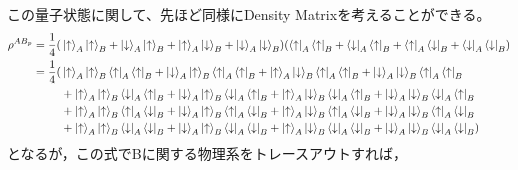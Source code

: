 この量子状態に関して、先ほど同様にDensity Matrixを考えることができる。
\begin{align}
  \rho^{AB_{p}}=\frac{1}{4}(&\ket{\uparrow}_{A}\ket{\uparrow}_{B}+\ket{\downarrow}_{A}\ket{\uparrow}_{B}+\ket{\uparrow}_{A}\ket{\downarrow}_{B}+\ket{\downarrow}_{A}\ket{\downarrow}_{B})
  (\bra{\uparrow}_{A}\bra{\uparrow}_{B}+\bra{\downarrow}_{A}\bra{\uparrow}_{B}+\bra{\uparrow}_{A}\bra{\downarrow}_{B}+\bra{\downarrow}_{A}\bra{\downarrow}_{B}) \nonumber \\
  =\frac{1}{4}(
&\ket{\uparrow}_{A}\ket{\uparrow}_{B}\bra{\uparrow}_{A}\bra{\uparrow}_{B}+\ket{\downarrow}_{A}\ket{\uparrow}_{B}\bra{\uparrow}_{A}\bra{\uparrow}_{B}+\ket{\uparrow}_{A}\ket{\downarrow}_{B}
\bra{\uparrow}_{A}\bra{\uparrow}_{B}+\ket{\downarrow}_{A}\ket{\downarrow}_{B}\bra{\uparrow}_{A}\bra{\uparrow}_{B}\nonumber \\
&+\ket{\uparrow}_{A}\ket{\uparrow}_{B}\bra{\downarrow}_{A}\bra{\uparrow}_{B}+\ket{\downarrow}_{A}\ket{\uparrow}_{B}\bra{\downarrow}_{A}\bra{\uparrow}_{B}+\ket{\uparrow}_{A}\ket{\downarrow}_{B}
\bra{\downarrow}_{A}\bra{\uparrow}_{B}+\ket{\downarrow}_{A}\ket{\downarrow}_{B}\bra{\downarrow}_{A}\bra{\uparrow}_{B}\nonumber \\
&+\ket{\uparrow}_{A}\ket{\uparrow}_{B}\bra{\uparrow}_{A}\bra{\downarrow}_{B}+\ket{\downarrow}_{A}\ket{\uparrow}_{B}\bra{\uparrow}_{A}\bra{\downarrow}_{B}+\ket{\uparrow}_{A}\ket{\downarrow}_{B}
\bra{\uparrow}_{A}\bra{\downarrow}_{B}+\ket{\downarrow}_{A}\ket{\downarrow}_{B}\bra{\uparrow}_{A}\bra{\downarrow}_{B}\nonumber \\
&+\ket{\uparrow}_{A}\ket{\uparrow}_{B}\bra{\downarrow}_{A}\bra{\downarrow}_{B}+\ket{\downarrow}_{A}\ket{\uparrow}_{B}\bra{\downarrow}_{A}\bra{\downarrow}_{B}+\ket{\uparrow}_{A}\ket{\downarrow}_{B}
\bra{\downarrow}_{A}\bra{\downarrow}_{B}+\ket{\downarrow}_{A}\ket{\downarrow}_{B}\bra{\downarrow}_{A}\bra{\downarrow}_{B}
)
\end{align}
となるが，この式でBに関する物理系をトレースアウトすれば，

